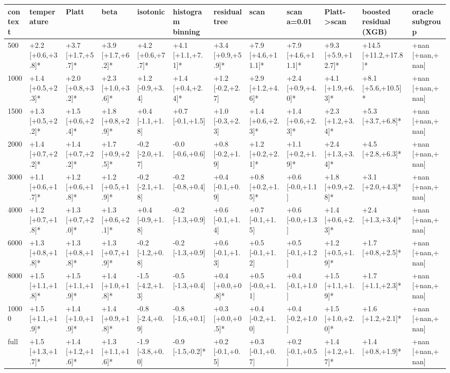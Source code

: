 \begin{tabular}{llllllllllll}
\toprule
context & temperature & Platt & beta & isotonic & histogram binning & residual tree & scan & scan a=0.01 & Platt->scan & boosted residual (XGB) & oracle subgroup \\
\midrule
500 & +2.2 [+0.6,+3.8]* & +3.7 [+1.7,+5.7]* & +3.9 [+1.7,+6.2]* & +4.2 [+0.6,+7.7]* & +4.1 [+1.1,+7.1]* & +3.4 [+0.9,+5.9]* & +7.9 [+4.6,+11.1]* & +7.9 [+4.6,+11.1]* & +9.3 [+5.9,+12.7]* & +14.5 [+11.2,+17.8]* & +nan [+nan,+nan] \\
1000 & +1.4 [+0.5,+2.3]* & +2.0 [+0.8,+3.2]* & +2.3 [+1.0,+3.6]* & +1.2 [-0.9,+3.4] & +1.4 [+0.4,+2.4]* & +1.2 [-0.2,+2.7] & +2.9 [+1.2,+4.6]* & +2.4 [+0.9,+4.0]* & +4.1 [+1.9,+6.3]* & +8.1 [+5.6,+10.5]* & +nan [+nan,+nan] \\
1500 & +1.3 [+0.5,+2.2]* & +1.5 [+0.6,+2.4]* & +1.8 [+0.8,+2.9]* & +0.4 [-1.1,+1.8] & +0.7 [-0.1,+1.5] & +1.0 [-0.3,+2.3] & +1.4 [+0.6,+2.3]* & +1.4 [+0.6,+2.3]* & +2.3 [+1.2,+3.4]* & +5.3 [+3.7,+6.8]* & +nan [+nan,+nan] \\
2000 & +1.4 [+0.7,+2.2]* & +1.4 [+0.7,+2.2]* & +1.7 [+0.9,+2.5]* & -0.2 [-2.0,+1.7] & -0.0 [-0.6,+0.6] & +0.8 [-0.2,+1.9] & +1.2 [+0.2,+2.1]* & +1.1 [+0.2,+1.9]* & +2.4 [+1.3,+3.4]* & +4.5 [+2.8,+6.3]* & +nan [+nan,+nan] \\
3000 & +1.1 [+0.6,+1.7]* & +1.2 [+0.6,+1.8]* & +1.2 [+0.5,+1.9]* & -0.2 [-2.1,+1.8] & -0.2 [-0.8,+0.4] & +0.4 [-0.1,+0.9] & +0.8 [+0.2,+1.5]* & +0.6 [-0.0,+1.1] & +1.8 [+0.9,+2.8]* & +3.1 [+2.0,+4.3]* & +nan [+nan,+nan] \\
4000 & +1.2 [+0.7,+1.8]* & +1.3 [+0.7,+2.0]* & +1.3 [+0.6,+2.1]* & +0.4 [-0.9,+1.8] & -0.2 [-1.3,+0.9] & +0.6 [-0.1,+1.4] & +0.7 [-0.1,+1.5] & +0.6 [-0.0,+1.3] & +1.4 [+0.6,+2.3]* & +2.4 [+1.3,+3.4]* & +nan [+nan,+nan] \\
6000 & +1.3 [+0.8,+1.8]* & +1.3 [+0.8,+1.8]* & +1.3 [+0.7,+1.9]* & -0.2 [-1.2,+0.8] & -0.2 [-1.3,+0.9] & +0.6 [-0.1,+1.3] & +0.5 [-0.1,+1.2] & +0.5 [-0.1,+1.2] & +1.2 [+0.5,+1.9]* & +1.7 [+0.8,+2.5]* & +nan [+nan,+nan] \\
8000 & +1.5 [+1.1,+1.8]* & +1.5 [+1.1,+1.9]* & +1.4 [+1.0,+1.8]* & -1.5 [-4.2,+1.3] & -0.5 [-1.3,+0.4] & +0.4 [+0.0,+0.8]* & +0.5 [-0.0,+1.1] & +0.4 [-0.1,+1.0] & +1.5 [+1.1,+1.9]* & +1.7 [+1.1,+2.3]* & +nan [+nan,+nan] \\
10000 & +1.5 [+1.1,+1.9]* & +1.4 [+1.0,+1.9]* & +1.4 [+0.9,+1.8]* & -0.8 [-2.4,+0.9] & -0.8 [-1.6,+0.1] & +0.3 [+0.0,+0.5]* & +0.4 [-0.2,+1.0] & +0.4 [-0.2,+1.0] & +1.5 [+1.0,+2.0]* & +1.6 [+1.2,+2.1]* & +nan [+nan,+nan] \\
full & +1.5 [+1.3,+1.7]* & +1.4 [+1.2,+1.6]* & +1.3 [+1.1,+1.6]* & -1.9 [-3.8,+0.0] & -0.9 [-1.5,-0.2]* & +0.2 [-0.1,+0.5] & +0.3 [-0.1,+0.7] & +0.2 [-0.1,+0.5] & +1.4 [+1.2,+1.7]* & +1.4 [+0.8,+1.9]* & +nan [+nan,+nan] \\
\bottomrule
\end{tabular}
